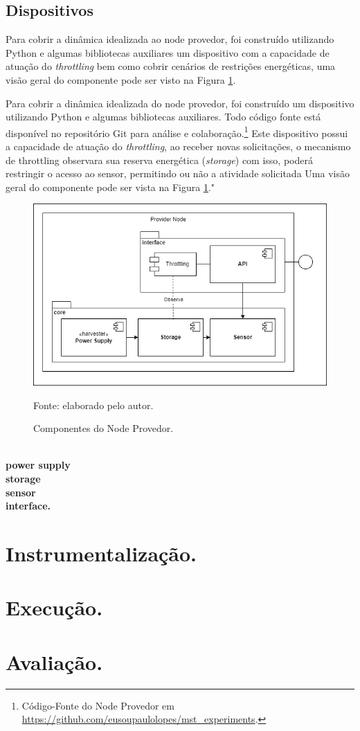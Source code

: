 \subsection{Dispositivos}

Para cobrir a dinâmica idealizada ao node provedor, foi construído utilizando Python e algumas bibliotecas auxiliares um dispositivo com a capacidade de atuação do \textit{throttling} bem como cobrir cenários de restrições energéticas, uma visão geral do componente pode ser visto na Figura \ref{fig:cap6providernode}.


Para cobrir a dinâmica idealizada do node provedor, foi construído um dispositivo utilizando Python e algumas bibliotecas auxiliares. Todo código fonte está disponível no repositório Git para análise e colaboração.\footnote{Código-Fonte do Node Provedor em \url{https://github.com/eusoupaulolopes/mst_experiments}.}  Este dispositivo possui a capacidade de atuação do \textit{throttling}, ao receber novas solicitações, o mecanismo de throttling observara sua reserva energética (\textit{storage}) com isso, poderá restringir o acesso ao sensor, permitindo ou não a atividade solicitada  Uma visão geral do componente pode ser vista na Figura \ref{fig:cap6providernode}."


\begin{figure}[H]
	\centering
	
	\caption{Componentes do Node Provedor.}
	\label{fig:cap6providernode}
	\noindent\includegraphics[width=0.75\linewidth]{Imagens/cap6/cap6providernode.png} 
	
	Fonte: elaborado pelo autor.
\end{figure}

\textbf{\\ power supply \\
storage \\
sensor \\ 
interface.}




\section{Instrumentalização.}
\section{Execução.}
\section{Avaliação.}
 